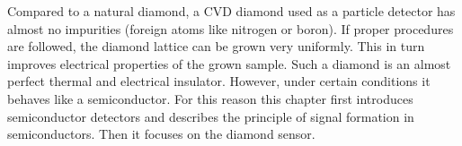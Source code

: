 Compared to a natural diamond, a CVD diamond used as a particle detector has almost no impurities (foreign atoms like nitrogen or boron). If proper procedures are followed, the diamond lattice can be grown very uniformly. This in turn improves electrical properties of the grown sample. Such a diamond is an almost perfect thermal and electrical insulator. However, under certain conditions it behaves like a semiconductor. For this reason this chapter first introduces semiconductor detectors and  describes the principle of signal formation in semiconductors. Then it focuses on the diamond sensor.


